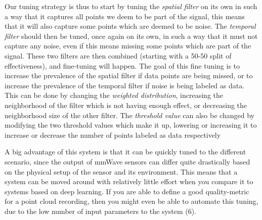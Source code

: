 Our tuning strategy is thus to start by tuning the \textit{spatial filter} on its own in such a way that it captures all points we deem to be part of the signal, this means that it will also capture some points which are deemed to be noise.
The \textit{temporal filter} should then be tuned, once again on its own, in such a way that it must not capture any noise, even if this means missing some points which are part of the signal.
These two filters are then combined (starting with a 50-50 split of effectiveness), and fine-tuning will happen. 
The goal of this fine tuning is to increase the prevalence of the spatial filter if data points are being missed, or to increase the prevalence of the temporal filter if noise is being labeled as data.
This can be done by changing the \textit{weighted distribution}, increasing the neighborhood of the filter which is not having enough effect, or decreasing the neighborhood size of the other filter. 
The \textit{threshold value} can also be changed by modifying the two threshold values which make it up, lowering or increasing it to increase or decrease the number of points labeled as data respectively

A big advantage of this system is that it can be quickly tuned to the different scenario, since the output of mmWave sensors can differ quite drastically based on the physical setup of the sensor and its environment.
This means that a system can be moved around with relatively little effort when you compare it to systems based on deep learning.
If you are able to define a good quality-metric for a point cloud recording, then you might even be able to automate this tuning, due to the low number of input parameters to the system (6).


